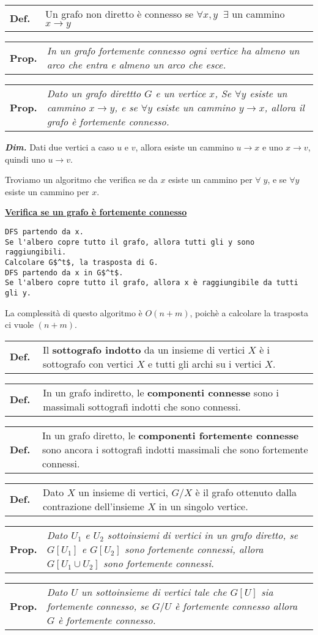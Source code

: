 \documentclass[a4paper,10pt]{article} %
\newcommand{\dimo}[1]{%
    \smallbreak \par \hfill\begin{minipage}{0.92\linewidth}{ \scriptsize {\textbf{\em{Dim.}}} {#1} }\end{minipage} \smallskip \par}
\newcommand{\malgorithm}[1]{%
    {\bigbreak \par \hspace*{4pt} \underline{\textbf {#1}}}}
\renewcommand{\b}[1]{%
    {\textbf{#1}}}
\newcommand{\mdef}[1]{%
    {\smallbreak\par\begin{tabular}{ll} \textbf{Def.$\;\;$} & \begin{minipage}[t]{0.80\columnwidth}\normalsize  {#1}\end{minipage}\tabularnewline \end{tabular}}\smallskip\par}
\newcommand{\mprop}[1]{%
    {\smallbreak\par\begin{tabular}{ll} \textbf{Prop.} & \begin{minipage}[t]{0.8\columnwidth}\emph  {#1}\end{minipage}\tabularnewline \end{tabular}}\smallskip\par}
\begin{document}
\mdef{Un grafo non diretto è connesso se $\forall x, y \; \; \exists $ un cammino $x \rightarrow y$}

\mprop{In un grafo fortemente connesso ogni vertice ha almeno un arco che entra e almeno un arco che esce.}

\mprop{Dato un grafo direttto $G$ e un vertice $x$, Se $\forall y$ esiste un cammino $x \rightarrow y$, e se $\forall y$ esiste un cammino $y \rightarrow x$, allora il grafo è fortemente connesso.}
\dimo{Dati due vertici a caso $u$ e $v$, allora esiste un cammino $u \rightarrow x$ e uno $x \rightarrow v$, quindi uno $u \rightarrow v$.}

Troviamo un algoritmo che verifica se da $x$ esiste un cammino per $\forall \; y$, e se $\forall y$ esiste un cammino per $x$.
\malgorithm{Verifica se un grafo è fortemente connesso}
\begin{lstlisting}
DFS partendo da x.
Se l'albero copre tutto il grafo, allora tutti gli y sono raggiungibili.
Calcolare G$^t$, la trasposta di G.
DFS partendo da x in G$^t$.
Se l'albero copre tutto il grafo, allora x è raggiungibile da tutti gli y.
\end{lstlisting}
La complessità di questo algoritmo è $O(n+m)$, poichè a calcolare la trasposta ci vuole $(n+m)$.

\mdef{Il \b{sottografo indotto} da un insieme di vertici $X$ è i sottografo con vertici $X$ e tutti gli archi su i vertici $X$.}

\mdef{In un grafo indiretto, le \b{componenti connesse} sono i massimali sottografi indotti che sono connessi.}
\mdef{In un grafo diretto, le \b{componenti fortemente connesse} sono ancora i sottografi indotti massimali che sono fortemente connessi.}

\mdef{Dato $X$ un insieme di vertici, $G / X$ è il grafo ottenuto dalla contrazione dell'insieme $X$ in un singolo vertice.}

\mprop{Dato $U_1$ e $U_2$ sottoinsiemi di vertici in un grafo diretto, se $G[U_1]$ e $G[U_2]$ sono fortemente connessi, allora $G[U_1 \cup U_2]$ sono fortemente connessi.} 

\mprop{Dato $U$ un sottoinsieme di vertici tale che $G[U]$ sia fortemente connesso, se $G / U$ è fortemente connesso allora $G$ è fortemente connesso.}
\end{document}
